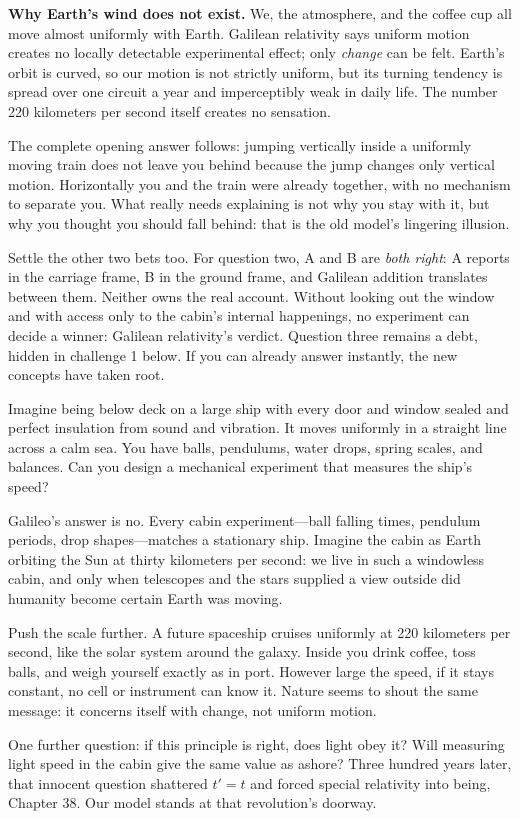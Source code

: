 \textbf{Why Earth's wind does not exist.} We, the atmosphere, and the coffee cup all move almost uniformly with Earth. Galilean relativity says uniform motion creates no locally detectable experimental effect; only \emph{change} can be felt. Earth's orbit is curved, so our motion is not strictly uniform, but its turning tendency is spread over one circuit a year and imperceptibly weak in daily life. The number 220 kilometers per second itself creates no sensation.

The complete opening answer follows: jumping vertically inside a uniformly moving train does not leave you behind because the jump changes only vertical motion. Horizontally you and the train were already together, with no mechanism to separate you. What really needs explaining is not why you stay with it, but why you thought you should fall behind: that is the old model's lingering illusion.

Settle the other two bets too. For question two, A and B are \emph{both right}: A reports in the carriage frame, B in the ground frame, and Galilean addition translates between them. Neither owns the real account. Without looking out the window and with access only to the cabin's internal happenings, no experiment can decide a winner: Galilean relativity's verdict. Question three remains a debt, hidden in challenge 1 below. If you can already answer instantly, the new concepts have taken root.


\begin{thought}
Imagine being below deck on a large ship with every door and window sealed and perfect insulation from sound and vibration. It moves uniformly in a straight line across a calm sea. You have balls, pendulums, water drops, spring scales, and balances. Can you design a mechanical experiment that measures the ship's speed?

Galileo's answer is no. Every cabin experiment---ball falling times, pendulum periods, drop shapes---matches a stationary ship. Imagine the cabin as Earth orbiting the Sun at thirty kilometers per second: we live in such a windowless cabin, and only when telescopes and the stars supplied a view outside did humanity become certain Earth was moving.

Push the scale further. A future spaceship cruises uniformly at 220 kilometers per second, like the solar system around the galaxy. Inside you drink coffee, toss balls, and weigh yourself exactly as in port. However large the speed, if it stays constant, no cell or instrument can know it. Nature seems to shout the same message: it concerns itself with change, not uniform motion.

One further question: if this principle is right, does light obey it? Will measuring light speed in the cabin give the same value as ashore? Three hundred years later, that innocent question shattered \(t'=t\) and forced special relativity into being, Chapter 38. Our model stands at that revolution's doorway.
\end{thought}

